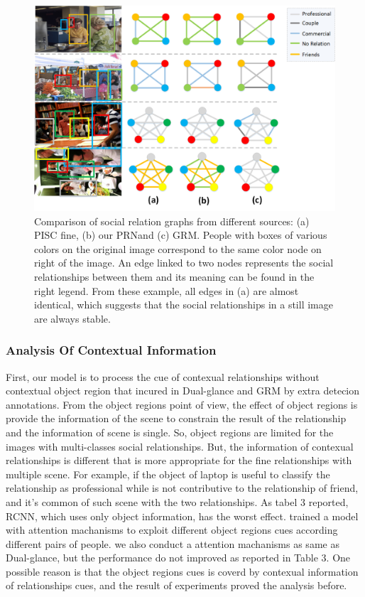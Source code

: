 \documentclass{article}
\newcommand{\PRN}{{\sf PRN}}
\begin{document}
\begin{figure}[ht]
  \centering
  \includegraphics[width=0.9\linewidth]{pic/case_study_pisc_fine_union.png}
  \caption{Comparison of social relation graphs from different sources: (a) PISC fine, (b) our \PRN and (c) GRM. People with boxes of various colors on the original image correspond to the same color node on right of the image. An edge linked to two nodes represents the social relationships between them and its meaning can be found in the right legend. From these example, all edges in (a) are almost identical, which suggests that the social relationships in a still image are always stable.}
  \label{fig:case_study}
\end{figure}

\subsubsection{Analysis Of Contextual Information}

First, our model is to process the cue of contexual relationships without contextual object region that incured in Dual-glance and GRM by extra detecion annotations. 
From the object regions point of view, the effect of object regions is provide the information of the scene to constrain the result of the relationship and the information of scene is single. So, object regions are limited for the images with multi-classes social relationships. But, the information of contexual relationships is different that is more appropriate for the fine relationships with multiple scene.
For example, if the object of laptop is useful to classify the relationship as professional while is not contributive to the relationship of friend, and it's common of such scene with the two relationships.
As tabel 3 reported, RCNN, which uses only object information, has the worst effect. \cite{DBLP:conf/iccv/LiWZK17} trained a model with attention machanisms to exploit different object regions cues according different pairs of people. we also conduct a attention machanisms as same as Dual-glance, but the performance do not improved as reported in Table 3. 
One possible reason is that the object regions cues is coverd by contexual information of relationships cues, and the result of experiments proved the analysis before. 
\end{document}
